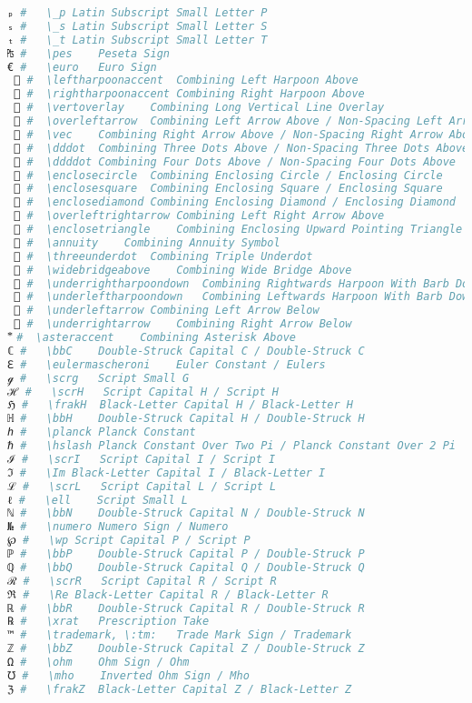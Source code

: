 \begin{lstlisting}[language=Julia, style=julia, linewidth=\textwidth]
ₚ #   \_p Latin Subscript Small Letter P
ₛ #   \_s Latin Subscript Small Letter S
ₜ #   \_t Latin Subscript Small Letter T
₧ #   \pes    Peseta Sign
€ #   \euro   Euro Sign
 ⃐ #  \leftharpoonaccent  Combining Left Harpoon Above
 ⃑ #  \rightharpoonaccent Combining Right Harpoon Above
 ⃒ #  \vertoverlay    Combining Long Vertical Line Overlay
 ⃖ #  \overleftarrow  Combining Left Arrow Above / Non-Spacing Left Arrow Above
 ⃗ #  \vec    Combining Right Arrow Above / Non-Spacing Right Arrow Above
 ⃛ #  \dddot  Combining Three Dots Above / Non-Spacing Three Dots Above
 ⃜ #  \ddddot Combining Four Dots Above / Non-Spacing Four Dots Above
 ⃝ #  \enclosecircle  Combining Enclosing Circle / Enclosing Circle
 ⃞ #  \enclosesquare  Combining Enclosing Square / Enclosing Square
 ⃟ #  \enclosediamond Combining Enclosing Diamond / Enclosing Diamond
 ⃡ #  \overleftrightarrow Combining Left Right Arrow Above
 ⃤ #  \enclosetriangle    Combining Enclosing Upward Pointing Triangle
 ⃧ #  \annuity    Combining Annuity Symbol
 ⃨ #  \threeunderdot  Combining Triple Underdot
 ⃩ #  \widebridgeabove    Combining Wide Bridge Above
 ⃬ #  \underrightharpoondown  Combining Rightwards Harpoon With Barb Downwards
 ⃭ #  \underleftharpoondown   Combining Leftwards Harpoon With Barb Downwards
 ⃮ #  \underleftarrow Combining Left Arrow Below
 ⃯ #  \underrightarrow    Combining Right Arrow Below
 ⃰ #  \asteraccent    Combining Asterisk Above
ℂ #   \bbC    Double-Struck Capital C / Double-Struck C
ℇ #   \eulermascheroni    Euler Constant / Eulers
ℊ #   \scrg   Script Small G
ℋ #   \scrH   Script Capital H / Script H
ℌ #   \frakH  Black-Letter Capital H / Black-Letter H
ℍ #   \bbH    Double-Struck Capital H / Double-Struck H
ℎ #   \planck Planck Constant
ℏ #   \hslash Planck Constant Over Two Pi / Planck Constant Over 2 Pi
ℐ #   \scrI   Script Capital I / Script I
ℑ #   \Im Black-Letter Capital I / Black-Letter I
ℒ #   \scrL   Script Capital L / Script L
ℓ #   \ell    Script Small L
ℕ #   \bbN    Double-Struck Capital N / Double-Struck N
№ #   \numero Numero Sign / Numero
℘ #   \wp Script Capital P / Script P
ℙ #   \bbP    Double-Struck Capital P / Double-Struck P
ℚ #   \bbQ    Double-Struck Capital Q / Double-Struck Q
ℛ #   \scrR   Script Capital R / Script R
ℜ #   \Re Black-Letter Capital R / Black-Letter R
ℝ #   \bbR    Double-Struck Capital R / Double-Struck R
℞ #   \xrat   Prescription Take
™ #   \trademark, \:tm:   Trade Mark Sign / Trademark
ℤ #   \bbZ    Double-Struck Capital Z / Double-Struck Z
Ω #   \ohm    Ohm Sign / Ohm
℧ #   \mho    Inverted Ohm Sign / Mho
ℨ #   \frakZ  Black-Letter Capital Z / Black-Letter Z

\end{lstlisting}
